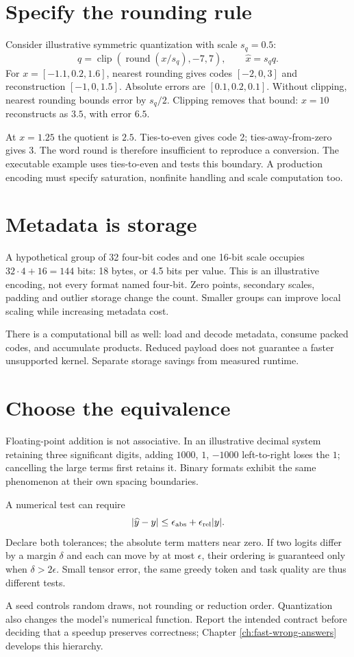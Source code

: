 \section{Specify the rounding rule}
Consider illustrative symmetric quantization with scale $s_q=0.5$:
\[
 q=\operatorname{clip}(\operatorname{round}(x/s_q),-7,7),
 \qquad \widehat{x}=s_q q.
\]
For $x=[-1.1,0.2,1.6]$, nearest rounding gives codes $[-2,0,3]$
and reconstruction $[-1,0,1.5]$. Absolute errors are $[0.1,0.2,0.1]$.
Without clipping, nearest rounding bounds error by $s_q/2$.
Clipping removes that bound: $x=10$ reconstructs as $3.5$, with error $6.5$.

At $x=1.25$ the quotient is $2.5$. Ties-to-even gives code 2;
ties-away-from-zero gives 3. The word round is therefore insufficient to
reproduce a conversion. The executable example uses ties-to-even and
tests this boundary. A production encoding must specify saturation,
nonfinite handling and scale computation too.

\section{Metadata is storage}
A hypothetical group of 32 four-bit codes and one 16-bit scale occupies
$32\cdot4+16=144$ bits: 18 bytes, or 4.5 bits per value.
This is an illustrative encoding, not every format named four-bit.
Zero points, secondary scales, padding and outlier storage change the count.
Smaller groups can improve local scaling while increasing metadata cost.

There is a computational bill as well: load and decode metadata, consume
packed codes, and accumulate products. Reduced payload does not guarantee
a faster unsupported kernel. Separate storage savings from measured runtime.

\section{Choose the equivalence}
Floating-point addition is not associative. In an illustrative decimal
system retaining three significant digits, adding $1000$, $1$, $-1000$
left-to-right loses the $1$; cancelling the large terms first retains it.
Binary formats exhibit the same phenomenon at their own spacing boundaries.

A numerical test can require
\[
 |\widehat y-y|\leq\epsilon_{\rm abs}+\epsilon_{\rm rel}|y|.
\]
Declare both tolerances; the absolute term matters near zero. If two logits
differ by a margin $\delta$ and each can move by at most $\epsilon$, their
ordering is guaranteed only when $\delta>2\epsilon$. Small tensor error,
the same greedy token and task quality are thus different tests.

A seed controls random draws, not rounding or reduction order. Quantization
also changes the model's numerical function. Report the intended contract
before deciding that a speedup preserves correctness; Chapter
\ref{ch:fast-wrong-answers} develops this hierarchy.
